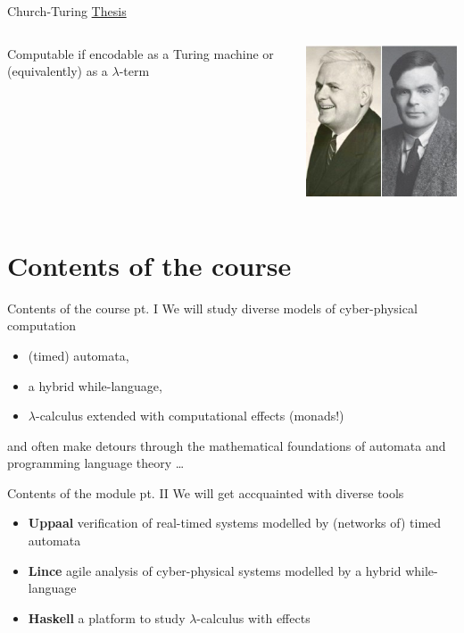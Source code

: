 \documentclass{beamer}
\begin{document}
\begin{frame}{Church-Turing \underline{Thesis}}
        \begin{minipage}[0.3\textheight]{\textwidth}
        \begin{columns}[c]
        \begin{column}{0.6\textwidth}
                \alert{Computable} if encodable as a Turing
                machine or (equivalently) as a $\lambda$-term
        \end{column}
        \begin{column}{0.2\textwidth}
          \includegraphics[scale=0.32]{Images/ChurchTuring.jpg}
        \end{column}
        \end{columns}
        \end{minipage}
\end{frame}
\section{Contents of the course}


\begin{frame}{Contents of the course pt. I}
  We will study diverse models of cyber-physical computation
  \begin{itemize}
  \item (timed) automata,
  \item a hybrid while-language,
  \item $\lambda$-calculus extended with computational effects (\alert{monads!})
  \end{itemize}

  \pause
  and often make detours through the \alert{mathematical foundations} of automata and
  programming language theory \dots
\end{frame}

\begin{frame}{Contents of the module pt. II}
  We will get accquainted with diverse tools
  \begin{itemize}
          \item \textbf{Uppaal} verification of real-timed systems modelled by (networks of) timed automata
          \item \textbf{Lince} agile analysis of cyber-physical systems modelled by a hybrid
          while-language
  \item \textbf{Haskell} a platform to study $\lambda$-calculus with effects
  \end{itemize}
\end{frame}
\end{document}
